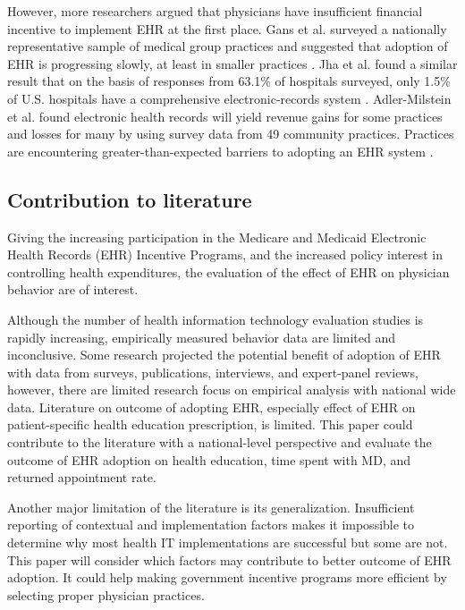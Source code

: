 However, more researchers argued that physicians have insufficient financial incentive to implement EHR at the first place. Gans et al. surveyed a nationally representative sample of medical group practices and suggested that adoption of EHR is progressing slowly, at least in smaller practices \citep{Gans2005}. Jha et al. found a similar result that on the basis of responses from 63.1\% of hospitals surveyed, only 1.5\% of U.S. hospitals have a comprehensive electronic-records system \citep{Jha2009}. Adler-Milstein et al. found electronic health records will yield revenue gains for some practices and losses for many by using survey data from 49 community practices. Practices are encountering greater-than-expected barriers to adopting an EHR system \citep{Adler-Milstein2012}.

\subsection{Contribution to literature}

Giving the increasing participation in the Medicare and Medicaid Electronic Health Records (EHR) Incentive Programs, and the increased policy interest in controlling health expenditures, the evaluation of the effect of EHR on physician behavior are of interest.

Although the number of health information technology evaluation studies is rapidly increasing, empirically measured behavior data are limited and inconclusive. Some research projected the potential benefit of adoption of EHR with data from surveys, publications, interviews, and expert-panel reviews, however, there are limited research focus on empirical analysis with national wide data. Literature on outcome of adopting EHR, especially effect of EHR on patient-specific health education prescription, is limited. This paper could contribute to the literature with a national-level perspective and evaluate the outcome of EHR adoption on health education, time spent with MD, and returned appointment rate.

Another major limitation of the literature is its generalization. Insufficient reporting of contextual and implementation factors makes it impossible to determine why most health IT implementations are successful but some are not. This paper will consider which factors may contribute to better outcome of EHR adoption. It could help making government incentive programs more efficient by selecting proper physician practices.


